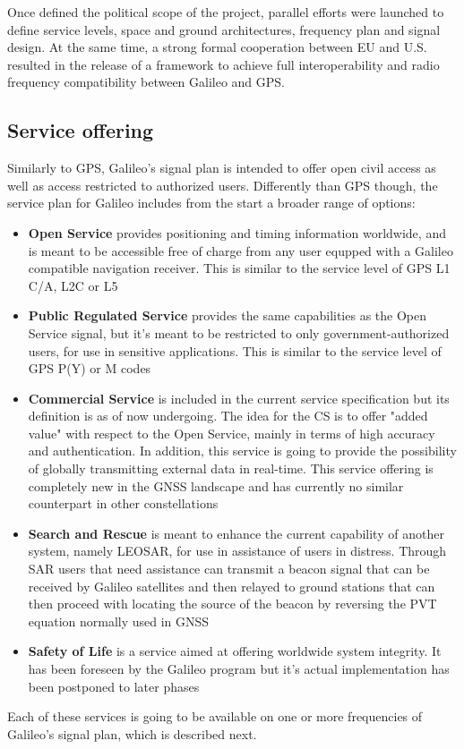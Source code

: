Once defined the political scope of the project, parallel efforts were launched
to define service levels, space and ground architectures, frequency plan and
signal design. At the same time, a strong formal cooperation between EU and U.S.
resulted in the release of a framework to achieve full interoperability and
radio frequency compatibility between Galileo and GPS.

\subsection{Service offering}
Similarly to GPS, Galileo's signal plan is intended to offer open civil access
as well as access restricted to authorized users. Differently than GPS though,
the service plan for Galileo includes from the start a broader range of options:
\begin{itemize}
  \item \textbf{Open Service} provides positioning and timing information
    worldwide, and is meant to be accessible free of charge from any user
    equpped with a Galileo compatible navigation receiver. This is similar to
    the service level of GPS L1 C/A, L2C or L5
  \item \textbf{Public Regulated Service} provides the same capabilities as the
    Open Service signal, but it's meant to be restricted to only
    government-authorized users, for use in sensitive applications. This is
    similar to the service level of GPS P(Y) or M codes
  \item \textbf{Commercial Service} is included in the current service
    specification but its definition is as of now undergoing. The idea for
    the CS is to offer "added value" with respect to the Open Service, mainly in
    terms of high accuracy and authentication. In addition, this service is
    going to provide the possibility of globally transmitting external data in
    real-time. This service offering is completely new in the GNSS landscape and
    has currently no similar counterpart in other constellations
  \item \textbf{Search and Rescue} is meant to enhance the current capability of
    another system, namely LEOSAR, for use in assistance of users in distress.
    Through SAR users that need assistance can transmit a beacon signal that can
    be received by Galileo satellites and then relayed to ground stations
    that can then proceed with locating the source of the beacon by reversing
    the PVT equation normally used in GNSS
  \item \textbf{Safety of Life} is a service aimed at offering worldwide system
    integrity. It has been foreseen by the Galileo program but it's actual
    implementation has been postponed to later phases
\end{itemize}
Each of these services is going to be available on one or more frequencies of
Galileo's signal plan, which is described next.

